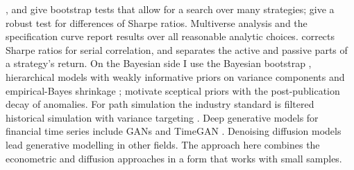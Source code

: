  \citet{white2000}, \citet{hansen2005} and \citet{romano2005} give bootstrap tests that allow for a search over many strategies; \citet{ledoit2008} give a robust test for differences of Sharpe ratios. Multiverse analysis \citep{steegen2016} and the specification curve \citep{simonsohn2020} report results over all reasonable analytic choices. \citet{lo2002} corrects Sharpe ratios for serial correlation, and \citet{lo2008} separates the active and passive parts of a strategy's return. On the Bayesian side I use the Bayesian bootstrap \citep{rubin1981}, hierarchical models with weakly informative priors on variance components \citep{gelman2006} and empirical-Bayes shrinkage \citep{efron2010}; \citet{mclean2016} motivate sceptical priors with the post-publication decay of anomalies. For path simulation the industry standard is filtered historical simulation \citep{baroneadesi1999} with variance targeting \citep{engle1996}. Deep generative models for financial time series include GANs \citep{wiese2020} and TimeGAN \citep{yoon2019}. Denoising diffusion models \citep{ho2020,nichol2021,song2021} lead generative modelling in other fields. The approach here combines the econometric and diffusion approaches in a form that works with small samples.
